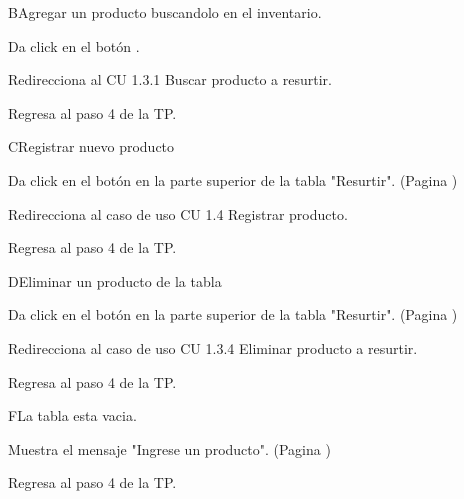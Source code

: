 \begin{UCtrayectoriaA}{B}{Agregar un producto buscandolo en el inventario.}
	
	\UCpaso[\UCactor] Da click en el botón .

	\UCpaso[\UCsist] Redirecciona al CU 1.3.1 Buscar producto a resurtir.

	\UCpaso[\UCsist] Regresa al paso 4 de la TP.
	
\end{UCtrayectoriaA}


\begin{UCtrayectoriaA}{C}{Registrar nuevo producto}
	
	\UCpaso[\UCactor] Da click en el botón  en la parte superior de la tabla "Resurtir". (Pagina \pageref{UI: resurtir vacio})

	\UCpaso[\UCsist] Redirecciona al caso de uso CU 1.4 Registrar producto.

	\UCpaso[\UCsist] Regresa al paso 4 de la TP.
	
\end{UCtrayectoriaA}

\begin{UCtrayectoriaA}{D}{Eliminar un producto de la tabla}
	
	\UCpaso[\UCactor] Da click en el botón  en la parte superior de la tabla "Resurtir". (Pagina \pageref{UI: resurtir vacio})

	\UCpaso[\UCsist] Redirecciona al caso de uso CU 1.3.4 Eliminar producto a resurtir.

	\UCpaso[\UCsist] Regresa al paso 4 de la TP.
	
\end{UCtrayectoriaA}

\begin{UCtrayectoriaA}{F}{La tabla esta vacia.}

	\UCpaso[\UCsist] Muestra el mensaje "Ingrese un producto".  (Pagina \pageref{UI: resurtir alerta busqueda})


	\UCpaso[\UCsist] Regresa al paso 4 de la TP.
	
\end{UCtrayectoriaA}





























